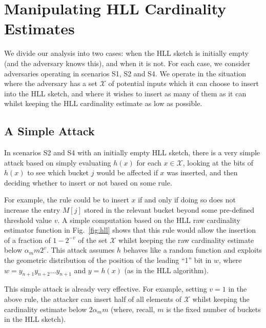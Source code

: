 \documentclass[sigconf, anonymous, dvipsnames]{acmart} %
\begin{document}


\section{Manipulating HLL Cardinality Estimates}\label{sec:manip}

We divide our analysis into two cases: when the HLL sketch is initially empty (and the adversary knows this), and when it is not. For each case, we consider adversaries operating in scenarios S1, S2 and S4. We operate in the situation where the adversary has a set $\mathcal{X}$ of potential inputs which it can choose to insert into the HLL sketch, and where it wishes to insert as many of them as it can whilst keeping the HLL cardinality estimate as low as possible.

\subsection{A Simple Attack}\label{sec:simple}

In scenarios S2 and S4 with an initially empty HLL sketch, there is a very simple attack based on simply evaluating $h(x)$ for each $x \in \mathcal{X}$, looking at the bits of $h(x)$ to see which bucket $j$ would be affected if $x$ was inserted, and then deciding whether to insert or not based on some rule. 

For example, the rule could be to insert $x$ if and only if doing so does not increase the entry $M[j]$ stored in the relevant bucket beyond some pre-defined threshold value $v$. A simple computation based on the HLL raw cardinality estimator function in Fig.~\ref{fig:hll} shows that this rule would allow the insertion of a fraction of  $1-2^{-v}$ of the set $\mathcal{X}$ whilst keeping the raw cardinality estimate below $\alpha_m m 2^v$. This attack assumes $h$ behaves like a random function and exploits the geometric distribution of the position of the leading ``1'' bit in $w$, where $w = y_{n+1}y_{n+2}\ldots y_{n+1}$ and $y=h(x)$ (as in the HLL algorithm). 

This simple attack is already very effective. For example, setting $v=1$ in the above rule, the attacker can insert half of all elements of $\mathcal{X}$ whilst keeping the cardinality estimate below $2\alpha_m m$ (where, recall, $m$ is the fixed number of buckets in the HLL sketch). 
\end{document}
